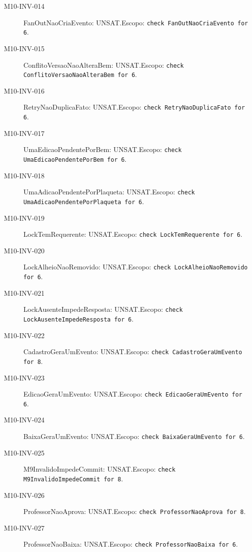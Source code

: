 \begin{description}
\item[M10-INV-014] FanOutNaoCriaEvento: UNSAT.\newline Escopo: \texttt{check FanOutNaoCriaEvento for 6}.
\item[M10-INV-015] ConflitoVersaoNaoAlteraBem: UNSAT.\newline Escopo: \texttt{check ConflitoVersaoNaoAlteraBem for 6}.
\item[M10-INV-016] RetryNaoDuplicaFato: UNSAT.\newline Escopo: \texttt{check RetryNaoDuplicaFato for 6}.
\item[M10-INV-017] UmaEdicaoPendentePorBem: UNSAT.\newline Escopo: \texttt{check UmaEdicaoPendentePorBem for 6}.
\item[M10-INV-018] UmaAdicaoPendentePorPlaqueta: UNSAT.\newline Escopo: \texttt{check UmaAdicaoPendentePorPlaqueta for 6}.
\item[M10-INV-019] LockTemRequerente: UNSAT.\newline Escopo: \texttt{check LockTemRequerente for 6}.
\item[M10-INV-020] LockAlheioNaoRemovido: UNSAT.\newline Escopo: \texttt{check LockAlheioNaoRemovido for 6}.
\item[M10-INV-021] LockAusenteImpedeResposta: UNSAT.\newline Escopo: \texttt{check LockAusenteImpedeResposta for 6}.
\item[M10-INV-022] CadastroGeraUmEvento: UNSAT.\newline Escopo: \texttt{check CadastroGeraUmEvento for 8}.
\item[M10-INV-023] EdicaoGeraUmEvento: UNSAT.\newline Escopo: \texttt{check EdicaoGeraUmEvento for 6}.
\item[M10-INV-024] BaixaGeraUmEvento: UNSAT.\newline Escopo: \texttt{check BaixaGeraUmEvento for 6}.
\item[M10-INV-025] M9InvalidoImpedeCommit: UNSAT.\newline Escopo: \texttt{check M9InvalidoImpedeCommit for 8}.
\item[M10-INV-026] ProfessorNaoAprova: UNSAT.\newline Escopo: \texttt{check ProfessorNaoAprova for 8}.
\item[M10-INV-027] ProfessorNaoBaixa: UNSAT.\newline Escopo: \texttt{check ProfessorNaoBaixa for 6}.

\end{description}
